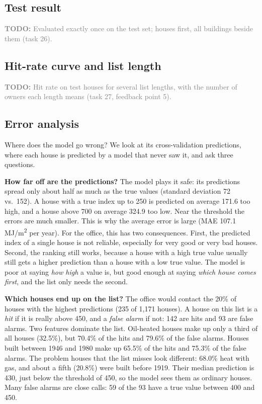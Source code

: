 \documentclass[11pt,a4paper]{article}
\newcommand{\todo}[1]{\noindent\textcolor{gray}{\small\textbf{TODO:} #1}\par\medskip}
\begin{document}
\subsection{Test result}
\todo{Evaluated exactly once on the test set; houses first, all buildings beside them (task 26).}

\subsection{Hit-rate curve and list length}
\todo{Hit rate on test houses for several list lengths, with the number of owners each length means (task 27,
feedback point 5).}

\subsection{Error analysis}
Where does the model go wrong? We look at its cross-validation predictions, where each
house is predicted by a model that never saw it, and ask three questions.

\textbf{How far off are the predictions?} The model plays it safe: its predictions spread only about half as much as the true values (standard deviation 72 vs.\ 152). A house with a true index up to 250 is predicted on average 171.6 too high, and a house above 700 on average 324.9 too low. Near the threshold the errors are much smaller. This is why the average error is large (MAE 107.1 MJ/m\textsuperscript{2} per year). For the office, this has two consequences. First, the predicted index of a single house is not reliable, especially for very good or very bad houses. Second, the ranking still works, because a house with a high true value usually still gets a higher prediction than a house with a low true value. The model is poor at saying \emph{how high} a value is, but good enough at saying \emph{which house comes first}, and the list only needs the second.

\textbf{Which houses end up on the list?} The office would contact the 20\% of houses with the highest predictions (235 of 1,171 houses). A house on this list is a \emph{hit} if it is really above 450, and a \emph{false alarm} if not: 142 are hits and 93 are false alarms. Two features dominate the list. Oil-heated houses make up only a third of all houses (32.5\%), but 70.4\% of the hits and 79.6\% of the false alarms. Houses built
between 1946 and 1980 make up 65.5\% of the hits and 75.3\% of the false alarms. The problem houses that the list misses look different: 68.0\% heat with gas, and about a fifth (20.8\%) were built before 1919. Their median prediction is 430, just below the threshold of 450, so the model sees them as ordinary houses. Many false alarms are close calls: 59 of the 93 have a true value between 400 and 450.
\end{document}

